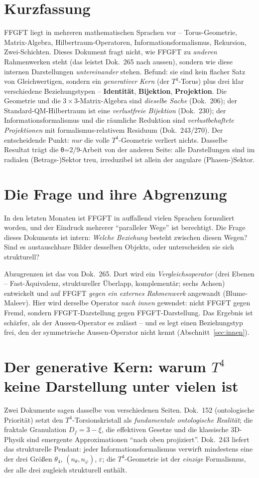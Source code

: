 \section*{Kurzfassung}
FFGFT liegt in mehreren mathematischen Sprachen vor -- Torus-Geometrie, Matrix-Algebra,
Hilbertraum-Operatoren, Informationsformalismus, Rekursion, Zwei-Schichten. Dieses Dokument
fragt nicht, wie FFGFT zu \emph{anderen} Rahmenwerken steht (das leistet Dok.~265 nach aussen),
sondern wie diese internen Darstellungen \emph{untereinander} stehen. Befund: sie sind kein
flacher Satz von Gleichwertigen, sondern ein \emph{generativer Kern} (der $T^4$-Torus) plus drei
klar verschiedene Beziehungstypen -- \textbf{Identität}, \textbf{Bijektion}, \textbf{Projektion}.
Die Geometrie und die $3\times3$-Matrix-Algebra sind \emph{dieselbe Sache} (Dok.~206); der
Standard-QM-Hilbertraum ist eine \emph{verlustfreie Bijektion} (Dok.~230); der
Informationsformalismus und die räumliche Reduktion sind \emph{verlustbehaftete Projektionen}
mit formalismus-relativem Residuum (Dok.~243/270). Der entscheidende Punkt: \emph{nur} die
volle $T^4$-Geometrie verliert nichts. Dasselbe Resultat trägt die θ=2/9-Arbeit von der anderen
Seite: alle Darstellungen sind im radialen (Betrags-)Sektor treu, irreduzibel ist allein der
angulare (Phasen-)Sektor.

\section{Die Frage und ihre Abgrenzung}
In den letzten Monaten ist FFGFT in auffallend vielen Sprachen formuliert worden, und der
Eindruck mehrerer \enquote{paralleler Wege} ist berechtigt. Die Frage dieses Dokuments ist
intern: \emph{Welche Beziehung} besteht zwischen diesen Wegen? Sind es austauschbare Bilder
desselben Objekts, oder unterscheiden sie sich strukturell?

Abzugrenzen ist das von Dok.~265. Dort wird ein \emph{Vergleichsoperator} (drei Ebenen --
Fast-Äquivalenz, struktureller Überlapp, komplementär; sechs Achsen) entwickelt und auf FFGFT
\emph{gegen ein externes Rahmenwerk} angewandt (Blume-Maleev). Hier wird derselbe Operator
\emph{nach innen} gewendet: nicht FFGFT gegen Fremd, sondern FFGFT-Darstellung gegen
FFGFT-Darstellung. Das Ergebnis ist schärfer, als der Aussen-Operator es zulässt -- und es legt
einen Beziehungstyp frei, den der symmetrische Aussen-Operator nicht kennt (Abschnitt~\ref{sec:innen}).

\section{Der generative Kern: warum $T^4$ keine Darstellung unter vielen ist}
Zwei Dokumente sagen dasselbe von verschiedenen Seiten. Dok.~152 (ontologische Priorität) setzt
den $T^4$-Torsionskristall als \emph{fundamentale ontologische Realität}; die fraktale
Granulation $D_f=3-\xi$, die effektiven Gesetze und die klassische 3D-Physik sind emergente
Approximationen \enquote{nach oben projiziert}. Dok.~243 liefert das strukturelle Pendant: jeder
Informationsformalismus verwirft mindestens eine der drei Größen $\theta_4$, $(n_\theta,n_\varphi)$,
$\varepsilon$; die $T^4$-Geometrie ist der \emph{einzige} Formalismus, der alle drei zugleich
strukturell enthält.

